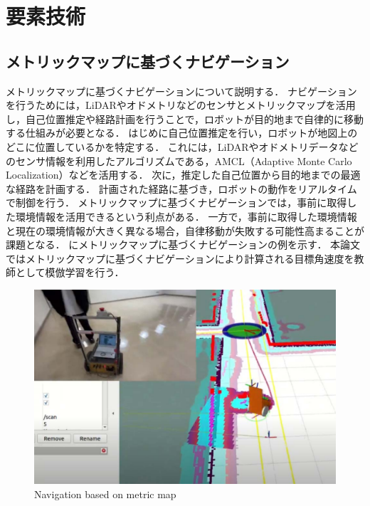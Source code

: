 \chapter{要素技術}
\section{メトリックマップに基づくナビゲーション}
メトリックマップに基づくナビゲーションについて説明する．
ナビゲーションを行うためには，LiDARやオドメトリなどのセンサとメトリックマップを活用し，自己位置推定や経路計画を行うことで，ロボットが目的地まで自律的に移動する仕組みが必要となる．
はじめに自己位置推定を行い，ロボットが地図上のどこに位置しているかを特定する．
これには，LiDARやオドメトリデータなどのセンサ情報を利用したアルゴリズムである，AMCL（Adaptive Monte Carlo Localization）などを活用する．
次に，推定した自己位置から目的地までの最適な経路を計画する．
計画された経路に基づき，ロボットの動作をリアルタイムで制御を行う．
メトリックマップに基づくナビゲーションでは，事前に取得した環境情報を活用できるという利点がある．
一方で，事前に取得した環境情報と現在の環境情報が大きく異なる場合，自律移動が失敗する可能性高まることが課題となる．
にメトリックマップに基づくナビゲーションの例を示す．
本論文ではメトリックマップに基づくナビゲーションにより計算される目標角速度を教師として模倣学習を行う．

\begin{figure}[htbp]
  \centering
  \includegraphics[width=130mm]{images/pdf/other/nav.pdf}
  \caption{Navigation based on metric map}
  \label{fig:nav}
\end{figure}